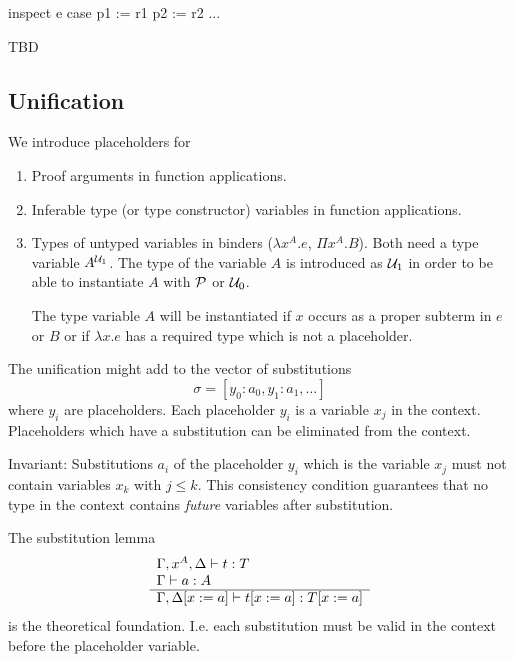 \begin{alba}
  inspect
    e
  case
    p1 := r1
    p2 := r2
    ...
\end{alba}


\vskip 5mm
TBD
\vskip 5mm




\newpage

\subsection{Unification}

We introduce placeholders for

\begin{enumerate}

\item Proof arguments in function applications.

\item Inferable type (or type constructor) variables in function applications.

\item Types of untyped variables in binders ($\lambda x^A . e$, $\Pi x^A
  . B$). Both need a type variable $A^{{\cal{U}}_1}$. The type of the variable $A$
  is introduced as ${\cal{U}}_1$ in order to be able to instantiate $A$ with
  ${\cal{P}}$ or ${\cal{U}}_0$.

  The type variable $A$ will be instantiated if $x$ occurs as a proper subterm
  in $e$ or $B$ or if $\lambda x . e$ has a required type which is not a
  placeholder.

\end{enumerate}


The unification might add to the vector of substitutions
$$
\sigma = [y_0 : a_0, y_1 : a_1, \ldots]
$$
where $y_i$ are placeholders. Each placeholder $y_i$ is a variable $x_j$ in
the context. Placeholders which have a substitution can be eliminated from the
context.

Invariant: Substitutions $a_i$ of the placeholder $y_i$ which is the variable
$x_j$ must not contain variables $x_k$ with $j \le k$. This consistency
condition guarantees that no type in the context contains \emph{future}
variables after substitution.


The substitution lemma
$$
\begin{array}{l} 
  \Gamma,x^A,\Delta \vdash t : T
  \\
  \Gamma \vdash a: A
 \\ \hline \Gamma, \Delta[x:=a] \vdash t[x:=a] : T[x:=a]\end{array}
$$
is the theoretical foundation. I.e. each substitution must be valid in the
context before the placeholder variable.





